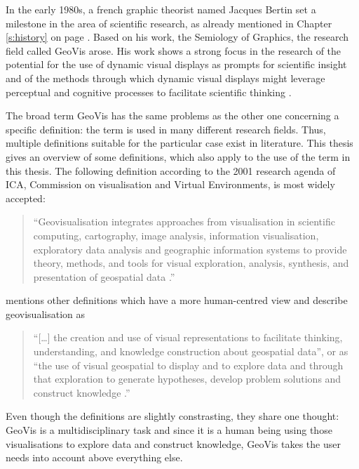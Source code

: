 In the early 1980s, a french graphic theorist named Jacques Bertin set a milestone in the area of scientific research, as already mentioned in Chapter \ref{s:history} on page \pageref{crossref:bertain}. Based on his work, the Semiology of Graphics, the research field called \ac{GeoVis} arose. His work shows a strong focus in the research of the potential for the use of dynamic visual displays as prompts for scientific insight and of the methods through which dynamic visual displays might leverage perceptual and cognitive processes to facilitate scientific thinking .

The broad term \ac{GeoVis} has the same problems as the other one concerning a specific definition: the term is used in many different research fields. Thus, multiple definitions suitable for the particular case exist in literature. This thesis gives an overview of some definitions, which also apply to the use of the term in this thesis.
The following definition according to the 2001 research agenda of \ac{ICA}, Commission on visualisation and Virtual Environments, is most widely accepted:
\begin{quote}
``Geovisualisation integrates approaches from visualisation in scientific computing, cartography, image analysis, information visualisation, exploratory data analysis and geographic information systems to provide theory, methods, and tools for visual exploration, analysis, synthesis, and presentation of geospatial data .''
\end{quote}

\citeauthor{Noellenburg2007} mentions other definitions which have a more human-centred view and describe geovisualisation as
\begin{quote}
``[\ldots] the creation and use of visual representations to facilitate thinking, understanding, and knowledge construction about geospatial data'', or as ``the use of visual geospatial to display and to explore data and through that exploration to generate hypotheses, develop problem solutions and construct knowledge .''
\end{quote}

\newpage
Even though the definitions are slightly constrasting, they share one thought: \ac{GeoVis} is a multidisciplinary task and since it is a human being using those visualisations to explore data and construct knowledge, \ac{GeoVis} takes the user needs into account above everything else.

\cbend